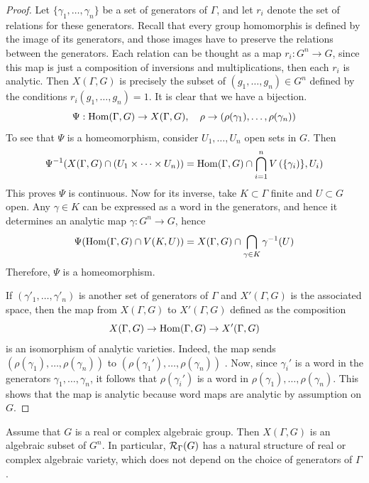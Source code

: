 \begin{proof}
	Let $\{\gamma_{1}, \dots, \gamma_n\}$ be a set of generators of $\Gamma$, and let $r_i$ denote the set of relations for these generators. Recall that every group homomorphis is defined by the image of its generators, and those images have to preserve the relations between the generators. Each relation can be thought as a map $r_i:G^n \to G$, since this map is just a composition of inversions and multiplications, then each $r_i$ is analytic. Then $X(\Gamma,G)$ is precisely the subset of $(g_{1},\dots,g_n) \in G^n$ defined by the conditions $r_i(g_{1},\dots,g_n)=1$. It is clear that we have a bijection.
	\[
		\Psi: \operatorname{Hom}(\Gamma,G) \to X(\Gamma,G), \quad \rho \to (\rho(\gamma_{1}),\dots,\rho(\gamma_n))
	\]
To see that $\Psi$ is a homeomorphism, consider $U_{1},\dots,U_n$ open sets in $G$. Then 
\[
	\Psi^{-1}(X(\Gamma,G)\cap \left(U_1 \times \dots \times U_n\right)) = \operatorname{Hom}(\Gamma,G) \cap \bigcap_{i=1}^n V \left(\{\gamma_i)\}, U_i \right)
\]
This proves $\Psi$ is continuous. Now for its inverse, take $K \subset \Gamma$ finite and $U \subset G$ open. Any $\gamma \in K$ can be expressed as a word in the generators, and hence it determines an analytic map $\gamma:G^n \to G $, hence
\[
	\Psi(\operatorname{Hom}(\Gamma,G)\cap V(K,U)) = X(\Gamma,G) \cap \bigcap_{\gamma \in K} \gamma ^{-1}(U)
\]
Therefore, $\Psi$ is a homeomorphism.

If $(\gamma'_{1},\dots,\gamma'_n)$ is another set of generators of $\Gamma$ and $X'(\Gamma,G)$ is the associated space, then the map from $X(\Gamma,G)$ to $X'(\Gamma,G)$ defined as the composition 
\[
	X(\Gamma,G) \to \operatorname{Hom}(\Gamma,G) \to X'(\Gamma,G)
\]is an isomorphism of analytic varieties. Indeed, the map sends $(\rho(\gamma_{1}),\dots,\rho(\gamma_n))$ to $(\rho(\gamma_{1}'),\dots,\rho(\gamma_n))$ . Now, since $\gamma_i'$ is a word in the generators $\gamma_{1},\dots,\gamma_n$, it follows that $\rho(\gamma_i')$ is a word in $\rho(\gamma_{1}),\dots,\rho(\gamma_n)$. This shows that the map is analytic because word maps are analytic by assumption on $G$.
\end{proof}

\begin{proposition}\label{prop:algebraic-structure}
    Assume that $G$ is a real or complex algebraic group. Then $X(\Gamma, G)$ is an algebraic subset of $G^n$. In particular, $\RepVar{\Gamma}{G}$ has a natural structure of real or complex algebraic variety, which does not depend on the choice of generators of $\Gamma$.
\end{proposition}

